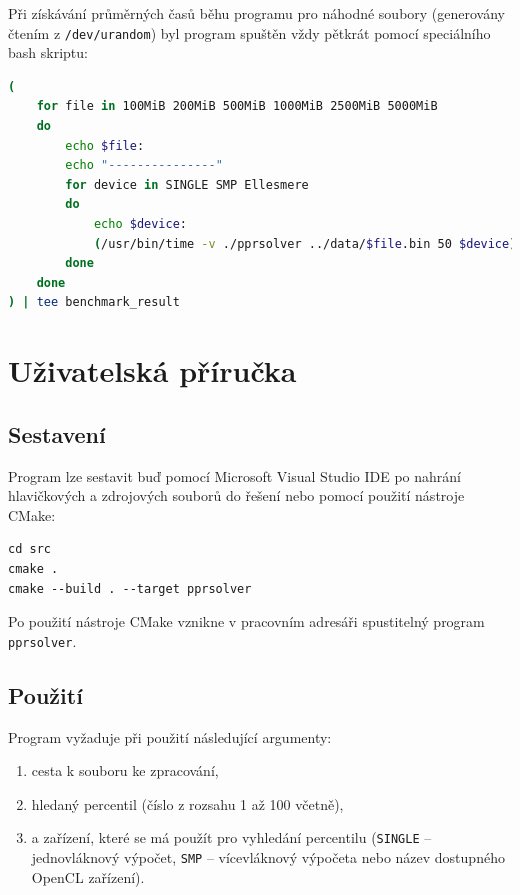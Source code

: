 \documentclass[12pt, a4paper]{article}
\let\oldsection\section
\renewcommand\section{\clearpage\oldsection}
\begin{document}
\newpage
Při získávání průměrných časů běhu programu pro náhodné soubory (generovány čtením z \texttt{/dev/urandom}) byl program spuštěn vždy pětkrát pomocí speciálního bash skriptu:

\begin{lstlisting}[language=bash,caption={Bash skript pro spuštění vytvořeného programu pro různé soubory a pro všechna dostupná zařízení.},captionpos=b, label={lst:benchmark-script}]
(
    for file in 100MiB 200MiB 500MiB 1000MiB 2500MiB 5000MiB
    do
        echo $file:
        echo "---------------"
        for device in SINGLE SMP Ellesmere
        do 
            echo $device:
            (/usr/bin/time -v ./pprsolver ../data/$file.bin 50 $device) 2>&1 | grep -E "Maximum resident set size|Elapsed|e) page faults"
        done 
    done
) | tee benchmark_result
\end{lstlisting}

\section{Uživatelská příručka}
\subsection{Sestavení}
Program lze sestavit buď pomocí Microsoft Visual Studio IDE po nahrání hlavičkových a zdrojových souborů do řešení nebo pomocí použití nástroje CMake: 

\begin{lstlisting}
cd src
cmake .
cmake --build . --target pprsolver
\end{lstlisting}

Po použití nástroje CMake vznikne v pracovním adresáři spustitelný program \texttt{pprsolver}.

\subsection{Použití}
Program vyžaduje při použití následující argumenty:

\begin{enumerate}
    \item cesta k souboru ke zpracování,
    \item hledaný percentil (číslo z rozsahu 1 až 100 včetně),
    \item a zařízení, které se má použít pro vyhledání percentilu (\texttt{SINGLE} -- jednovláknový výpočet, \texttt{SMP} -- vícevláknový výpočeta nebo název dostupného OpenCL zařízení).
\end{enumerate}
\end{document}
